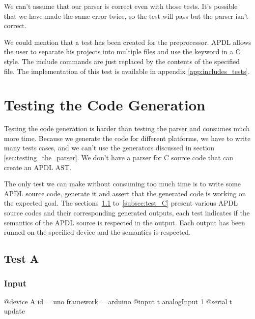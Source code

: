 We can't assume that our parser is correct even with those tests. It's possible
that we have made the same error twice, so the test will pass but the parser
isn't correct.

We could mention that a test has been created for the preprocessor. \gls{APDL} allows
the user to separate his projects into multiple files and use the
 keyword in a C style. The include commands are just
replaced by the contents of the specified file. The implementation of this test
is available in appendix \ref{app:includes_tests}.

\section{Testing the Code Generation}
\label{sec:testing_code_generation}

Testing the code generation is harder than testing the parser and
consumes much more time. Because we generate the code for different platforms,
we have to write many tests cases, and we can't use the
generators discussed in section \ref{sec:testing_the_parser}. We don't have a
parser for C source code that can create an \gls{APDL} \gls{AST}.

The only test we can make without consuming too much time is to write some
\gls{APDL} source code, generate it and assert that the generated code is
working on the expected goal. The sections~\ref{subsec:test_A}
to~\ref{subsec:test_C} present various APDL source codes and their corresponding
generated outputs, each test indicates if the semantics of the APDL source is
respected in the output. Each output has been runned on the specified device
and the semantics is respected.

\subsection{Test A}
\label{subsec:test_A}

\subsubsection*{Input}
\begin{apdlcode}
@device A {
    id = uno
    framework = arduino
    @input t analogInput 1
    @serial t update
}
\end{apdlcode}

